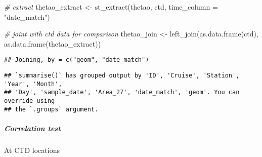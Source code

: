 \documentclass[
]{article}
\newenvironment{Shaded}{\begin{snugshade}}{\end{snugshade}}
\newcommand{\AttributeTok}[1]{\textcolor[rgb]{0.77,0.63,0.00}{#1}}
\newcommand{\CommentTok}[1]{\textcolor[rgb]{0.56,0.35,0.01}{\textit{#1}}}
\newcommand{\FunctionTok}[1]{\textcolor[rgb]{0.00,0.00,0.00}{#1}}
\newcommand{\NormalTok}[1]{#1}
\newcommand{\OtherTok}[1]{\textcolor[rgb]{0.56,0.35,0.01}{#1}}
\newcommand{\SpecialCharTok}[1]{\textcolor[rgb]{0.00,0.00,0.00}{#1}}
\newcommand{\StringTok}[1]{\textcolor[rgb]{0.31,0.60,0.02}{#1}}
\begin{document}
\begin{Shaded}
\begin{Highlighting}[]
\CommentTok{\# extract }
\NormalTok{thetao\_extract }\OtherTok{\textless{}{-}} \FunctionTok{st\_extract}\NormalTok{(thetao, ctd, }\AttributeTok{time\_column =} \StringTok{"date\_match"}\NormalTok{)}

\CommentTok{\# joint with ctd data for comparison}
\NormalTok{thetao\_join }\OtherTok{\textless{}{-}} \FunctionTok{left\_join}\NormalTok{(}\FunctionTok{as.data.frame}\NormalTok{(ctd), }\FunctionTok{as.data.frame}\NormalTok{(thetao\_extract))}
\end{Highlighting}
\end{Shaded}

\begin{verbatim}
## Joining, by = c("geom", "date_match")
\end{verbatim}

\begin{Shaded}
\end{Shaded}

\begin{verbatim}
## `summarise()` has grouped output by 'ID', 'Cruise', 'Station', 'Year', 'Month',
## 'Day', 'sample_date', 'Area_27', 'date_match', 'geom'. You can override using
## the `.groups` argument.
\end{verbatim}

\hypertarget{correlation-test}{%
\subparagraph{Correlation test}\label{correlation-test}}

At CTD locations

\begin{Shaded}
\end{Shaded}
\end{document}
